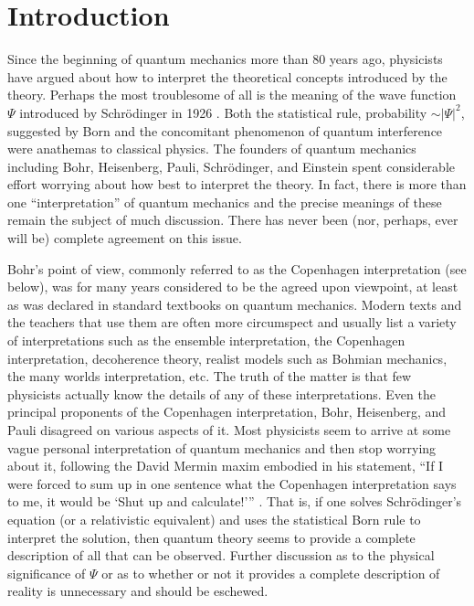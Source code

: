 \documentclass [12pt]{revtex4}
\begin{document}
\maketitle

\section{Introduction}\label{INTRO}

Since the beginning of quantum mechanics more than 80 years ago,
physicists have argued about how to interpret the theoretical
concepts introduced by the theory. Perhaps the most troublesome of
all is the meaning of the wave function $\Psi$
 introduced by Schr\"{o}dinger in 1926 \cite{S2003}. Both the
statistical rule, probability $\sim  |\Psi|^{2}$, suggested by Born
\cite{B1926} and the concomitant phenomenon of quantum interference were
anathemas to classical physics. The founders of quantum mechanics
including Bohr, Heisenberg, Pauli, Schr\"{o}dinger, and
Einstein spent considerable effort worrying about how best to
interpret the theory. In fact, there is more than one
``interpretation'' of quantum mechanics and the precise meanings of
these remain the subject of much discussion. There has never been
(nor, perhaps, ever will be) complete agreement on this issue.

Bohr's point of view, commonly referred to as the {Copenhagen
interpretation} (see below), was for many years considered to be the agreed
upon viewpoint, at least as was declared in standard textbooks on quantum
mechanics. Modern texts and the teachers that use them are often more
circumspect and usually list a variety of interpretations such as the ensemble interpretation, the Copenhagen interpretation, decoherence
theory, realist models such as Bohmian mechanics, the many worlds
interpretation, etc. The truth of the matter is that few physicists actually
know the details of any of these interpretations.  Even the principal
proponents of the Copenhagen interpretation, Bohr, Heisenberg, and Pauli
disagreed on various aspects of it. Most physicists seem to arrive at
some vague personal interpretation of quantum mechanics and then stop
worrying about it, following the David Mermin maxim embodied in his
statement, ``If I were forced to sum up in one sentence what the
Copenhagen interpretation says to me, it would be {`Shut up and
calculate!'}'' \cite{M1989}. That is, if one solves
Schr\"{o}dinger's equation (or a relativistic equivalent) and uses
the statistical Born rule to interpret the solution, then quantum
theory seems to provide a complete description of all that can be
observed. Further discussion as to the physical significance of
$\Psi$ or as to whether or not it provides a complete description of
reality is unnecessary and should be eschewed.
\end{document}
